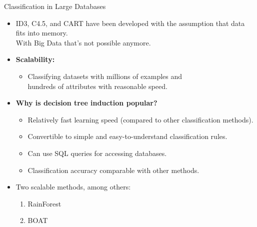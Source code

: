 \begin{frame}{Classification in Large Databases}
	\begin{itemize}
		\item ID3, C4.5, and CART have been developed with the assumption that data fits into memory.\\With Big Data that's not possible anymore.
		\item \textbf{Scalability:}
		      \begin{itemize}
			      \item Classifying datasets with millions of examples and \\ hundreds of attributes with reasonable speed.
		      \end{itemize}
		\item \textbf{Why is decision tree induction popular?}
		      \begin{itemize}
			      \item Relatively fast learning speed (compared to other classification methods).
			      \item Convertible to simple and easy-to-understand classification rules.
			      \item Can use SQL queries for accessing databases.
			      \item Classification accuracy comparable with other methods.
		      \end{itemize}
		\item Two scalable methods, among others:
		      \begin{enumerate}
			      \item RainForest
			      \item BOAT
		      \end{enumerate}
	\end{itemize}
\end{frame}

